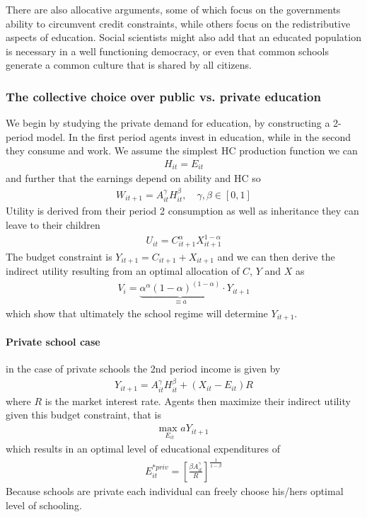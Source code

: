 \documentclass[12pt, a4paper]{article}
\begin{document}
\begin{multicols}{2}
There are also allocative arguments, some of which focus on the governments ability to circumvent credit constraints, while others focus on the redistributive aspects of education. Social scientists might also add that an educated population is necessary in a well functioning democracy, or even that common schools generate a common culture that is shared by all citizens.

\subsubsection{The collective choice over public vs. private education}
We begin by studying the private demand for education, by constructing a 2-period model. In the first period agents invest in education, while in the second they consume and work. We assume the simplest HC production function we can
\begin{align*}
H_{it} = E_{it}
\end{align*}
and further that the earnings depend on ability and HC so
\begin{align*}
W_{it+1} = A_{it}^{\gamma}H_{it}^{\beta}, \quad \gamma, \beta \in [0,1]
\end{align*}
Utility is derived from their period 2 consumption as well as inheritance they can leave to their children
\begin{align*}
U_{it} = C_{it+1}^{\alpha}X_{it+1}^{1-\alpha}
\end{align*}
The budget constraint is $Y_{it+1}=C_{it+1}+X_{it+1}$ and we can then derive the indirect utility resulting from an optimal allocation of $C$, $Y$ and $X$ as
\begin{align*}
V_i = \underbrace{\alpha^{\alpha}(1-\alpha)^{(1-\alpha)} }_{\equiv a} \cdot Y_{it+1}
\end{align*}
which show that ultimately the school regime will determine $Y_{it+1}$.

\paragraph{Private school case} in the case of private schools the 2nd period income is given by
\begin{align*}
Y_{it+1} = A_{it}^{\gamma}H_{it}^{\beta} + (X_{it} - E_{it})R
\end{align*}
where $R$ is the market interest rate. Agents then maximize their indirect utility given this budget constraint, that is
\begin{align*}
\underset{E_{it}}{\text{max }} a Y_{it+1}
\end{align*}
which results in an optimal level of educational expenditures of
\begin{align*}
E_{it}^{*priv} = \left[ \frac{\beta A_{it}^{\gamma}}{R} \right]^{\frac{1}{1-\beta}}
\end{align*}
Because schools are private each individual can freely choose his/hers optimal level of schooling.


\end{multicols}
\end{document}
